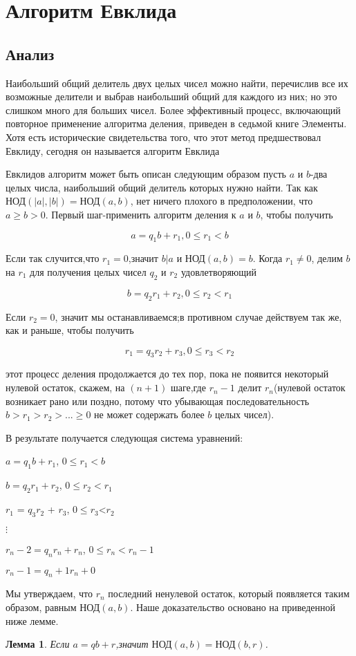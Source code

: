 \documentclass[11pt]{article}
\newtheorem{lemma}{Лемма}
\begin{document}
\section{Алгоритм Евклида}
\subsection{Анализ}
Наибольший общий делитель двух целых чисел можно найти, перечислив все их возможные делители и выбрав наибольший общий для каждого из них; но это слишком много для больших чисел. Более эффективный процесс, включающий повторное применение алгоритма деления, приведен в седьмой книге
Элементы.
Хотя есть исторические свидетельства того, что этот метод предшествовал Евклиду, сегодня он называется
алгоритм Евклида

 Евклидов алгоритм может быть описан следующим образом пусть $a$ и $b$-два целых числа, наибольший общий делитель которых нужно найти. Так как $\text{НОД}(|a|,|b|)=\text{НОД}(a,b)$, нет ничего плохого в предположении, что $a\ge b > 0$.
 Первый шаг-применить алгоритм деления к $a$ и $b$, чтобы получить
 
 	\[a=q_1b+r_1, 0\le r_1<b\]
 
 Если так случится,что $r_1=0$,значит $b|a$ и $\text{НОД}(a,b)=b$. Когда $r_1 \neq 0$,
 делим $b$ на $r_1$ для получения целых чисел $q_2$ и $r_2$ удовлетворяющий
 
 	\[b = q_2r_1 + r_2, 0\le r_2<r_1\]
 
 Если $r_2=0$, значит мы останавливаемся;в противном случае действуем так же, как и раньше, чтобы получить
 
 	\[r_1 = q_3r_2 + r_3, 0\le r_3<r_2\]
 
этот процесс деления продолжается до тех пор, пока не появится некоторый нулевой остаток, скажем, на $(n+1)$ шаге,где $r_n-1$ делит $r_n$(нулевой остаток возникает рано или поздно, потому что убывающая последовательность $b > r_1 > r_2 > ... \ge 0$ не может содержать более $b$ целых чисел).

В результате получается следующая система уравнений:
\begin{center}
	$a=q_1 b+r_1$,	$0\le r_1<b$
	
	$b = q_2r_1 + r_2$, $0\le r_2<r_1$
	
	$r_1$ = $q_3$$r_2$ + $r_3$, $0\le r_3$<$r_2$

    $\vdots$
    
    $r_n-2 = q_nr_n + r_n$, $0\le r_n<r_n-1$
    
    $r_n-1 = q_n+1r_n + 0$
\end{center}
Мы утверждаем, что $r_n$ последний ненулевой остаток, который появляется таким образом, равным $\text{НОД}(a,b)$. Наше доказательство основано на приведенной ниже лемме.
\begin{lemma}
	Если $a=qb+r$,значит $\text{НОД}(a,b)=\text{НОД}(b,r)$.
\end{lemma}
\nocite{Burton}


\end{document}
